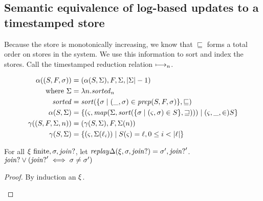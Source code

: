 \documentclass{llncs}
\newcommand{\setof}[1]{\{ #1 \}}
\begin{document}
\subsection{Semantic equivalence of log-based updates to a timestamped store}

Because the store is monotonically increasing, we know that
$\sqsubseteq$ forms a total order on stores in the system. We use this
information to sort and index the stores. Call the timestamped reduction relation $\mathbin{\longmapsto_n}$.

\begin{align*}
\alpha((S,F,\msto)) &= (\alpha(S,\Sigma), F, \Sigma, |\Sigma|-1) \\
\text{ where } \Sigma &= \lambda n. \sorted_n \\
               \sorted &= \sort(\setof{\msto \mid \ttuple{\_}{\msto} \in \prep(S,F,\msto)},\sqsubseteq) \\
\alpha(S,\Sigma) &=
   \setof{\ttuple{\mstate}
                 {\map(\Sigma,\sort(\setof{\msto \mid \ttuple{\mstate}{\msto} \in S}, \sqsupseteq))}
           \mid \ttuple{\mstate,\_} \in S} \\
\gamma((S,F,\Sigma,n)) &= (\gamma(S,\Sigma), F, \Sigma(n)) \\
\gamma(S,\Sigma) &= \setof{\ttuple{\mstate}{\Sigma(\ell_i)} \mid S(\mstate) = \ell, 0 \le i < |\ell|}
\end{align*}



\begin{lemma}
For all $\xi \text{ finite},\sigma,\mathit{join?}$, let $\mathit{replay}\Delta(\xi,\sigma,\mathit{join?}) = \sigma',\mathit{join?}'$.
$\mathit{join?} \vee (\mathit{join?}' \iff \sigma \neq \sigma')$
\end{lemma}
\begin{proof}
By induction an $\xi$.
\begin{byCases}
\end{byCases}
\end{proof}
\end{document}
